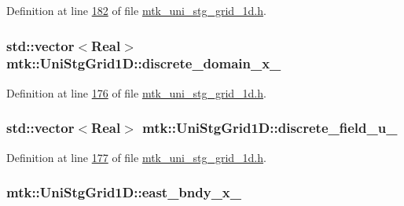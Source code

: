 Definition at line \hyperlink{mtk__uni__stg__grid__1d_8h_source_l00182}{182} of file \hyperlink{mtk__uni__stg__grid__1d_8h_source}{mtk\-\_\-uni\-\_\-stg\-\_\-grid\-\_\-1d.\-h}.

\hypertarget{classmtk_1_1UniStgGrid1D_a0a1f9c00e21659e05f414dd97e2a52e3}{
\subsubsection[{discrete\-\_\-domain\-\_\-x\-\_\-}]{\setlength{\rightskip}{0pt plus 5cm}std\-::vector$<${\bf Real}$>$ mtk\-::\-Uni\-Stg\-Grid1\-D\-::discrete\-\_\-domain\-\_\-x\-\_\-\hspace{0.3cm}{\ttfamily [private]}}}\label{classmtk_1_1UniStgGrid1D_a0a1f9c00e21659e05f414dd97e2a52e3}


Definition at line \hyperlink{mtk__uni__stg__grid__1d_8h_source_l00176}{176} of file \hyperlink{mtk__uni__stg__grid__1d_8h_source}{mtk\-\_\-uni\-\_\-stg\-\_\-grid\-\_\-1d.\-h}.

\hypertarget{classmtk_1_1UniStgGrid1D_a9a1e7c4ff7f83787a1844d8b24af8045}{
\subsubsection[{discrete\-\_\-field\-\_\-u\-\_\-}]{\setlength{\rightskip}{0pt plus 5cm}std\-::vector$<${\bf Real}$>$ mtk\-::\-Uni\-Stg\-Grid1\-D\-::discrete\-\_\-field\-\_\-u\-\_\-\hspace{0.3cm}{\ttfamily [private]}}}\label{classmtk_1_1UniStgGrid1D_a9a1e7c4ff7f83787a1844d8b24af8045}


Definition at line \hyperlink{mtk__uni__stg__grid__1d_8h_source_l00177}{177} of file \hyperlink{mtk__uni__stg__grid__1d_8h_source}{mtk\-\_\-uni\-\_\-stg\-\_\-grid\-\_\-1d.\-h}.

\hypertarget{classmtk_1_1UniStgGrid1D_a69a7d6be3171e53177e476348d04f4ae}{
\subsubsection[{east\-\_\-bndy\-\_\-x\-\_\-}]{ mtk\-::\-Uni\-Stg\-Grid1\-D\-::east\-\_\-bndy\-\_\-x\-\_\-\hspace{0.3cm}{\ttfamily [private]}}}\label{classmtk_1_1UniStgGrid1D_a69a7d6be3171e53177e476348d04f4ae}


